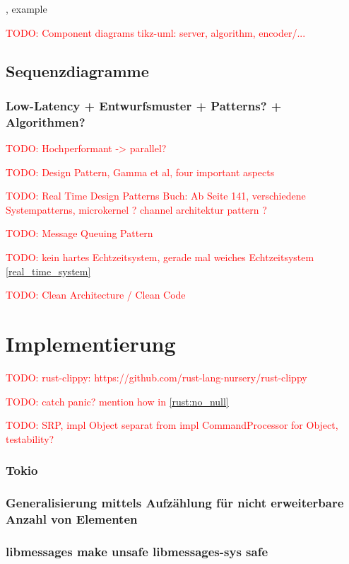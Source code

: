 \documentclass[
	12pt,
	table,
	bigheadings,
	ngerman,
	a4paper,
	BCOR5mm,
	DIV14,
	1.1headlines,
	pagesize,
	oneside,
	openright,
	titlepage,
	headsepline,
	nochapterprefix,
	bibtotoc,
	tocindent,
	listsindent,
	pointlessnumbers,
	cleardoubleempty,
	fleqn,
	halfparskip
]{scrbook}
\newcommand{\todo}[1]{\textcolor{red}{TODO: #1}}
\begin{document}
		\cite[446]{goll2012methoden}, example \cite[457]{goll2012methoden}
		  
		\todo{Component diagrams tikz-uml: server, algorithm, encoder/...}		
		
		\section{Sequenzdiagramme}
		
		\subsection{Low-Latency + Entwurfsmuster + Patterns? + Algorithmen?}
		\todo{Hochperformant -> parallel?}
		
		\todo{Design Pattern, Gamma et al, four important aspects}
		
		\todo{Real Time Design Patterns Buch: Ab Seite 141, verschiedene Systempatterns, microkernel \cite[151]{douglass2003real}? channel architektur pattern \cite[167]{douglass2003real}?}
		
		\todo{Message Queuing Pattern \cite[207]{douglass2003real}}
		
		\todo{kein hartes Echtzeitsystem, gerade mal weiches Echtzeitsystem \autoref{real_time_system}}
		
		\todo{Clean Architecture / Clean Code}
	
	\chapter{Implementierung}
	
	\todo{rust-clippy: https://github.com/rust-lang-nursery/rust-clippy}
	
	\todo{catch panic? mention how in \autoref{rust:no_null}}
	
	\todo{SRP, impl Object separat from impl CommandProcessor for Object, testability?}
	
	\subsection{Tokio}
	
		\subsection{Generalisierung mittels Aufzählung für nicht erweiterbare Anzahl von Elementen}
		
		\subsection{libmessages make unsafe libmessages-sys safe}
		
\end{document}
